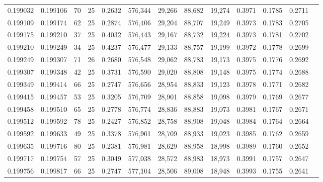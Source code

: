 \begin{tabular}{rrrrrrrrrrrrr}
0.199032 & 0.199106 &  70 &  25 &                                     0.2632 & 576,344 &  29,266 &  88,682 &  19,274 & 0.3971 & 0.1785 & 0.2711 \\
0.199109 & 0.199174 &  62 &  25 &                                     0.2874 & 576,406 &  29,204 &  88,707 &  19,249 & 0.3973 & 0.1783 & 0.2705 \\
0.199175 & 0.199210 &  37 &  25 &                                     0.4032 & 576,443 &  29,167 &  88,732 &  19,224 & 0.3973 & 0.1781 & 0.2702 \\
0.199210 & 0.199249 &  34 &  25 &                                     0.4237 & 576,477 &  29,133 &  88,757 &  19,199 & 0.3972 & 0.1778 & 0.2699 \\
0.199249 & 0.199307 &  71 &  26 &                                     0.2680 & 576,548 &  29,062 &  88,783 &  19,173 & 0.3975 & 0.1776 & 0.2692 \\
0.199307 & 0.199348 &  42 &  25 &                                     0.3731 & 576,590 &  29,020 &  88,808 &  19,148 & 0.3975 & 0.1774 & 0.2688 \\
0.199349 & 0.199414 &  66 &  25 &                                     0.2747 & 576,656 &  28,954 &  88,833 &  19,123 & 0.3978 & 0.1771 & 0.2682 \\
0.199415 & 0.199457 &  53 &  25 &                                     0.3205 & 576,709 &  28,901 &  88,858 &  19,098 & 0.3979 & 0.1769 & 0.2677 \\
0.199458 & 0.199510 &  65 &  25 &                                     0.2778 & 576,774 &  28,836 &  88,883 &  19,073 & 0.3981 & 0.1767 & 0.2671 \\
0.199512 & 0.199592 &  78 &  25 &                                     0.2427 & 576,852 &  28,758 &  88,908 &  19,048 & 0.3984 & 0.1764 & 0.2664 \\
0.199592 & 0.199633 &  49 &  25 &                                     0.3378 & 576,901 &  28,709 &  88,933 &  19,023 & 0.3985 & 0.1762 & 0.2659 \\
0.199635 & 0.199716 &  80 &  25 &                                     0.2381 & 576,981 &  28,629 &  88,958 &  18,998 & 0.3989 & 0.1760 & 0.2652 \\
0.199717 & 0.199754 &  57 &  25 &                                     0.3049 & 577,038 &  28,572 &  88,983 &  18,973 & 0.3991 & 0.1757 & 0.2647 \\
0.199756 & 0.199817 &  66 &  25 &                                     0.2747 & 577,104 &  28,506 &  89,008 &  18,948 & 0.3993 & 0.1755 & 0.2641 \\

\end{tabular}
